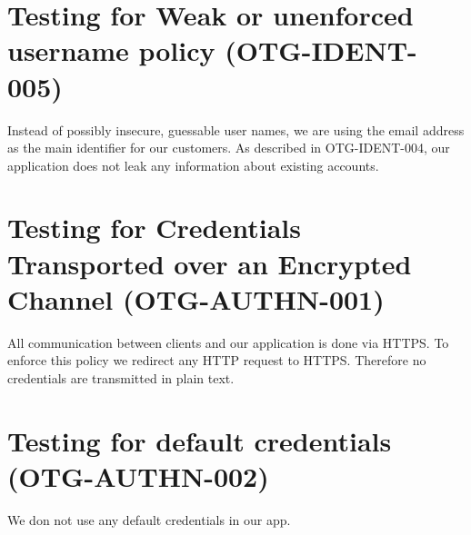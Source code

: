 \section{Testing for Weak or unenforced username policy (OTG-IDENT-005)}
Instead of possibly insecure, guessable user names, we are using the email address as the main identifier for our customers. As described in OTG-IDENT-004, our application does not leak any information about existing accounts.

\section{Testing for Credentials Transported over an Encrypted Channel (OTG-AUTHN-001)}
All communication between clients and our application is done via HTTPS. To enforce this policy we redirect any HTTP request to HTTPS. Therefore no credentials are transmitted in plain text.

\section{Testing for default credentials (OTG-AUTHN-002)}
We don not use any default credentials in our app. 


